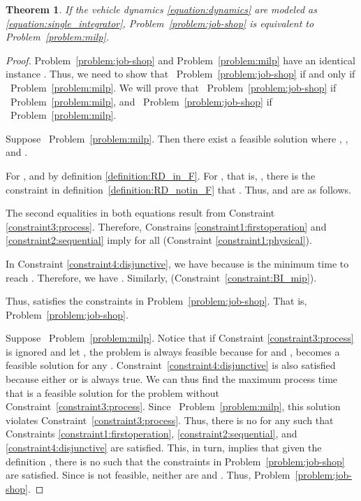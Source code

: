 \documentclass{sig-alternate}
\newtheorem{theorem}{Theorem}
\begin{document}
\begin{theorem}\label{theorem:P3_equivalent_P4}
	If the vehicle dynamics \eqref{equation:dynamics} are modeled as \eqref{equation:single_integrator}, Problem~\ref{problem:job-shop} is equivalent to Problem~\ref{problem:milp}.
\end{theorem}
\begin{proof}
	Problem~\ref{problem:job-shop} and Problem~\ref{problem:milp} have an identical instance . Thus, we need to show that ~Problem~\ref{problem:job-shop} if and only if ~Problem~\ref{problem:milp}. We will prove that ~Problem~\ref{problem:job-shop} if ~Problem~\ref{problem:milp}, and ~Problem~\ref{problem:job-shop} if ~Problem~\ref{problem:milp}. 
	
	Suppose ~Problem~\ref{problem:milp}. Then there exist a feasible solution  where , , and . 
	
	For ,  and  by definition \eqref{definition:RD_in_F}. For , that is, , there is the constraint in definition~\eqref{definition:RD_notin_F} that . Thus,  and  are as follows.
	
	The second equalities in both equations result from Constraint \ref{constraint3:process}. Therefore, Constrains \ref{constraint1:firstoperation} and \ref{constraint2:sequential} imply  for all  (Constraint \eqref{constraint1:physical}).
		
	In Constraint \ref{constraint4:disjunctive}, we have  because  is the minimum time to reach . Therefore, we have . Similarly,  (Constraint~\eqref{constraint:BI_mip}).
	
	Thus,  satisfies the constraints in Problem~\ref{problem:job-shop}. That is,  Problem~\ref{problem:job-shop}.

	Suppose ~Problem~\ref{problem:milp}. Notice that if Constraint \ref{constraint3:process} is ignored and let , the problem is always feasible because for  and ,
	 becomes a feasible solution for any . Constraint~\ref{constraint4:disjunctive} is also satisfied because either  or  is always true. We can thus find the maximum process time that is a feasible solution for the problem without Constraint~\ref{constraint3:process}. Since ~Problem~\ref{problem:milp}, this solution violates Constraint~\ref{constraint3:process}. Thus, there is no  for any  such that Constraints \ref{constraint1:firstoperation}, \ref{constraint2:sequential}, and \ref{constraint4:disjunctive} are satisfied. This, in turn, implies that given the definition , there is no  such that the constraints in Problem~\ref{problem:job-shop} are satisfied. Since  is not feasible, neither are  and . Thus,  Problem~\ref{problem:job-shop}.
\end{proof}
\end{document}
